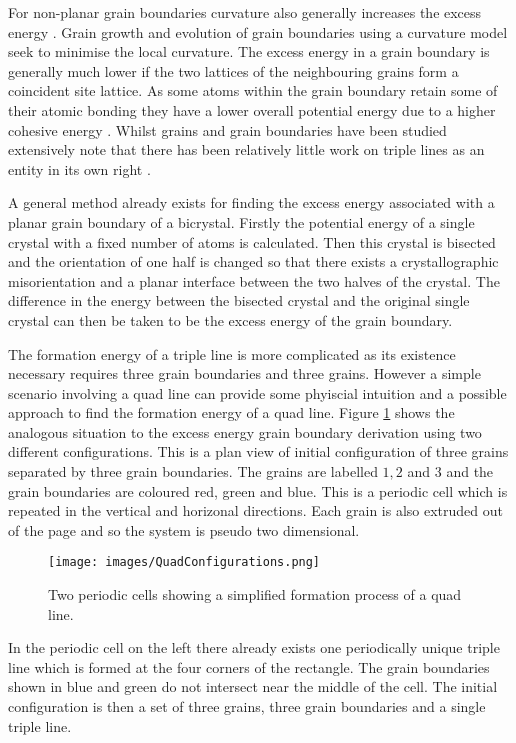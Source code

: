 \documentclass[12pt,a4paper]{book}
\begin{document}
For non-planar grain boundaries curvature also generally increases the excess energy \cite{Mason2015}. Grain growth and evolution of grain boundaries using a curvature model seek to minimise the local curvature.  The excess energy in a grain boundary is generally much lower if the two lattices of the neighbouring grains form a coincident site lattice. As some atoms within the grain boundary retain some of their atomic bonding they have a lower overall potential energy due to a higher cohesive energy \cite{Rohrer2011}. Whilst grains and grain boundaries have been studied extensively \citeauthor{Chaix:149279} note that there has been relatively little work on triple lines as an entity in its own right \cite{Chaix:149279}.

A general method already exists for finding the excess energy associated with a planar grain boundary of a bicrystal. Firstly the potential energy of a single crystal with a fixed number of atoms is calculated. Then this crystal is bisected and the orientation of one half is changed so that there exists a crystallographic misorientation and a planar interface between the two halves of the crystal. The difference in the energy between the bisected crystal and the original single crystal can then be taken to be the excess energy of the grain boundary.

The formation energy of a triple line is more complicated as its existence necessary requires three grain boundaries and three grains. However a simple scenario involving a quad line can provide some phyiscial intuition and a possible approach to find the formation energy of a quad line. Figure \ref{fig:Quad} shows the analogous situation to the excess energy grain boundary derivation using two different configurations. This is a plan view of initial configuration of three grains separated by three grain boundaries. The grains are labelled $1, 2$ and $3$ and the grain boundaries are coloured red, green and blue. This is a periodic cell which is repeated in the vertical and horizonal directions. Each grain is also extruded out of the page and so the system is pseudo two dimensional.
\newpage
\begin{figure}[H]
	\centering
	\texttt{[image: images/QuadConfigurations.png]} 
\label{fig:Quad}
\caption{Two periodic cells showing a simplified formation process of a quad line.}
\end{figure}
 
In the periodic cell on the left there already exists one periodically unique triple line which is formed at the four corners of the rectangle. The grain boundaries shown in blue and green do not intersect near the middle of the cell. The initial configuration is then a set of three grains, three grain boundaries and a single triple line.
\end{document}
